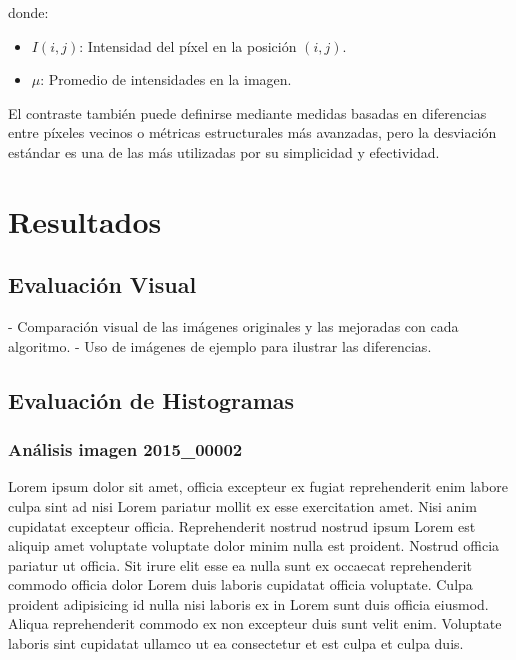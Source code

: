 \documentclass[sigchi]{acmart}
\begin{document}
donde:
\begin{itemize}
    \item $I(i,j)$: Intensidad del píxel en la posición $(i,j)$.
    \item $\mu$: Promedio de intensidades en la imagen.
\end{itemize}

El contraste también puede definirse mediante medidas basadas en diferencias entre píxeles vecinos o métricas estructurales más avanzadas, pero la desviación estándar es una de las más utilizadas por su simplicidad y efectividad.


\section{Resultados}
\subsection{Evaluación Visual}
- Comparación visual de las imágenes originales y las mejoradas con cada algoritmo.
- Uso de imágenes de ejemplo para ilustrar las diferencias.

\newpage
\subsection{Evaluación de Histogramas}

\subsubsection{Análisis imagen 2015\_00002}

Lorem ipsum dolor sit amet, officia excepteur ex fugiat reprehenderit enim labore culpa sint ad
nisi Lorem pariatur mollit ex esse exercitation amet. Nisi anim cupidatat excepteur officia.
Reprehenderit nostrud nostrud ipsum Lorem est aliquip amet voluptate voluptate dolor minim
nulla est proident. Nostrud officia pariatur ut officia. Sit irure elit esse ea nulla sunt ex
occaecat reprehenderit commodo officia dolor Lorem duis laboris cupidatat officia voluptate.
Culpa proident adipisicing id nulla nisi laboris ex in Lorem sunt duis officia eiusmod. Aliqua
reprehenderit commodo ex non excepteur duis sunt velit enim. Voluptate laboris sint cupidatat
ullamco ut ea consectetur et est culpa et culpa duis.
\end{document}
